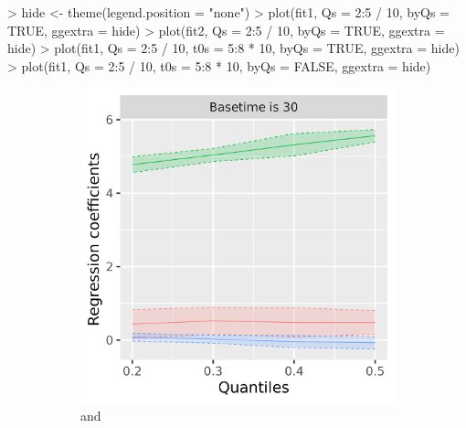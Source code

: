 \begin{example}
  > hide <- theme(legend.position = "none")
  > plot(fit1, Qs = 2:5 / 10, byQs = TRUE, ggextra = hide)
  > plot(fit2, Qs = 2:5 / 10, byQs = TRUE, ggextra = hide)
  > plot(fit1, Qs = 2:5 / 10, t0s = 5:8 * 10, byQs = TRUE, ggextra = hide)
  > plot(fit1, Qs = 2:5 / 10, t0s = 5:8 * 10, byQs = FALSE, ggextra = hide)
\end{example}
% 

\begin{figure}[ht] 
  \centering
    \begin{subfigure}[b]{0.47\linewidth}
    \includegraphics[width = 1.0\textwidth]{realdata_smooth_quantile.png}
    \caption{ and }    
    \label{fig:realdata_smooth}
  \end{subfigure}
  \begin{subfigure}[b]{0.47\linewidth}

\end{subfigure}
\end{figure}
